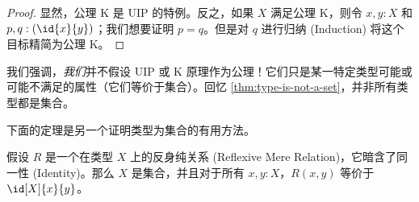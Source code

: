 \begin{proof}
    显然，公理 K 是 UIP 的特例。反之，如果 $X$ 满足公理 K，则令 $x, y : X$ 和 $p, q : (\id{x}{y})$；我们想要证明 $p=q$。但是对 $q$ 进行归纳 (Induction) 将这个目标精简为公理 K。
\end{proof}

我们强调，\emph{我们}并不假设 UIP 或 K 原理作为公理！它们只是某一特定类型可能或可能不满足的属性（它们等价于集合）。回忆 \cref{thm:type-is-not-a-set}，并非所有类型都是集合。

下面的定理是另一个证明类型为集合的有用方法。

\begin{thm}\label{thm:h-set-refrel-in-paths-sets}
%
假设 $R$ 是一个在类型 $X$ 上的反身纯关系 (Reflexive Mere Relation)，它暗含了同一性 (Identity)。那么 $X$ 是集合，并且对于所有 $x,y:X$，$R(x,y)$ 等价于 $\id[X]{x}{y}$。
\end{thm}

